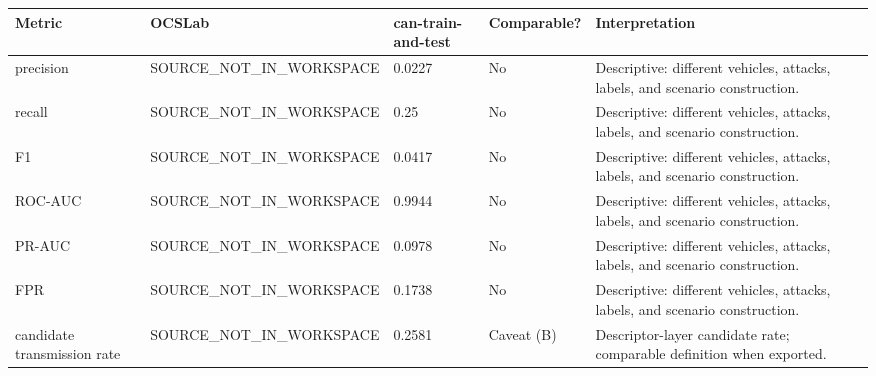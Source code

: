 \begin{tabular}{lllll}
\toprule
Metric & OCSLab & can-train-and-test & Comparable? & Interpretation \\
\midrule
precision & SOURCE_NOT_IN_WORKSPACE & 0.0227 & No & Descriptive: different vehicles, attacks, labels, and scenario construction. \\
recall & SOURCE_NOT_IN_WORKSPACE & 0.25 & No & Descriptive: different vehicles, attacks, labels, and scenario construction. \\
F1 & SOURCE_NOT_IN_WORKSPACE & 0.0417 & No & Descriptive: different vehicles, attacks, labels, and scenario construction. \\
ROC-AUC & SOURCE_NOT_IN_WORKSPACE & 0.9944 & No & Descriptive: different vehicles, attacks, labels, and scenario construction. \\
PR-AUC & SOURCE_NOT_IN_WORKSPACE & 0.0978 & No & Descriptive: different vehicles, attacks, labels, and scenario construction. \\
FPR & SOURCE_NOT_IN_WORKSPACE & 0.1738 & No & Descriptive: different vehicles, attacks, labels, and scenario construction. \\
candidate transmission rate & SOURCE_NOT_IN_WORKSPACE & 0.2581 & Caveat (B) & Descriptor-layer candidate rate; comparable definition when exported. \\
\bottomrule
\end{tabular}
